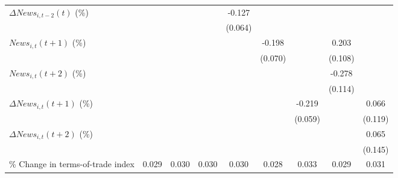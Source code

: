 {\begin{tabular}{l*{8}{c}}
\addlinespace
$ \Delta News_{i,t-2}(t)$ (\%)&                     &                     &                     &      -0.127\sym{*}  &                     &                     &                     &                     \\
                    &                     &                     &                     &     (0.064)         &                     &                     &                     &                     \\
\addlinespace
$ News_{i,t}(t+1)$ (\%)&                     &                     &                     &                     &      -0.198\sym{***}&                     &       0.203\sym{*}  &                     \\
                    &                     &                     &                     &                     &     (0.070)         &                     &     (0.108)         &                     \\
\addlinespace
$ News_{i,t}(t+2)$ (\%)&                     &                     &                     &                     &                     &                     &      -0.278\sym{**} &                     \\
                    &                     &                     &                     &                     &                     &                     &     (0.114)         &                     \\
\addlinespace
$ \Delta News_{i,t}(t+1)$ (\%)&                     &                     &                     &                     &                     &      -0.219\sym{***}&                     &       0.066         \\
                    &                     &                     &                     &                     &                     &     (0.059)         &                     &     (0.119)         \\
\addlinespace
$ \Delta News_{i,t}(t+2)$ (\%)&                     &                     &                     &                     &                     &                     &                     &       0.065         \\
                    &                     &                     &                     &                     &                     &                     &                     &     (0.145)         \\
\addlinespace
\% Change in terms-of-trade index&       0.029\sym{**} &       0.030\sym{**} &       0.030\sym{**} &       0.030\sym{**} &       0.028\sym{**} &       0.033\sym{**} &       0.029\sym{**} &       0.031\sym{**} \\

\end{tabular}}
